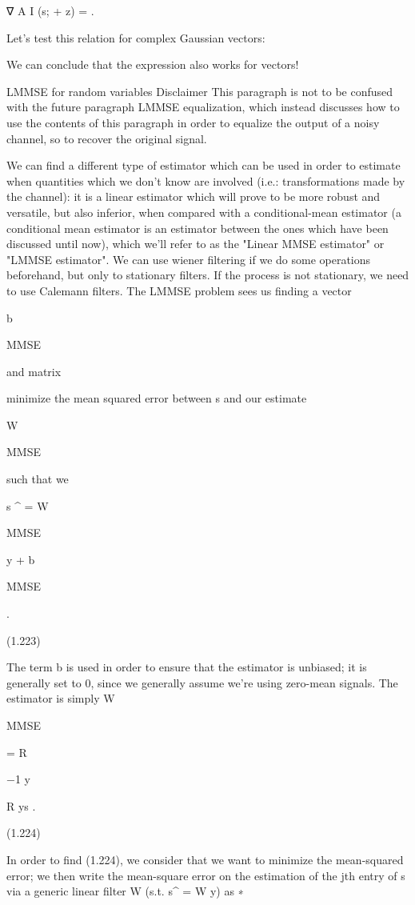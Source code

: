 {∇ A I (s; \sqrt{\rhoAs} + z) = \rhoAE .

Let's test this relation for complex Gaussian vectors:

We can conclude that the expression also works for vectors!

LMMSE for random variables
​Disclaimer This paragraph is not to be confused with the future paragraph LMMSE equalization,
which instead discusses how to use the contents of this paragraph in order to equalize the output of a noisy channel, so to recover the original signal.

We can find a different type of estimator which can be used in order to estimate when quantities which we don't know are involved (i.e.: transformations made by the channel): it is a linear estimator which will prove to be more robust and versatile, but also inferior, when compared with a conditional-mean estimator (a conditional mean estimator is an estimator between the ones which have been discussed until now),
which we'll refer to as the "Linear MMSE estimator" or "LMMSE estimator".
We can use wiener filtering if we do some operations beforehand, but only to stationary filters.
If the process is not stationary, we need to use Calemann filters.
The LMMSE problem sees us finding a vector

b

MMSE

and matrix

minimize the mean squared error between s and our estimate

W

MMSE

such that we

s
^ = W

MMSE

y + b

MMSE

.

(1.223)

The term b is used in order to ensure that the estimator is unbiased; it is generally set to 0, since we generally assume we're using zero-mean signals.
The estimator is simply W

MMSE

= R

−1 y

R ys .

(1.224)

In order to find (1.224), we consider that we want to minimize the mean-squared error;
we then write the mean-square error on the estimation of the jth entry of s via a generic linear filter W (s.t. s^ = W y) as
∗

}
